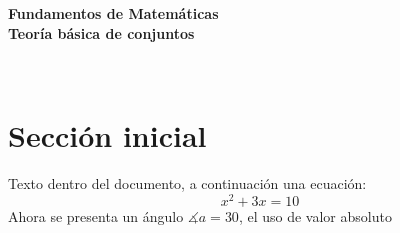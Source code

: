 

\begin{centering}
\bf{ \Large  Fundamentos de Matemáticas \\
Teoría básica de conjuntos \\
}
\end{centering}
\ 
\section{Sección inicial}
Texto dentro del documento, a continuación una ecuación:
\begin{equation}
x^2+3x=10
\end{equation}
Ahora se presenta un ángulo $\measuredangle a=30$, el uso de valor absoluto
\abs{ x^3-2}

